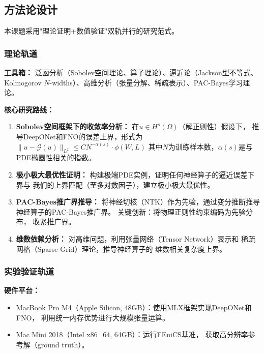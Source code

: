 \documentclass[12pt,a4paper,twoside]{article}
\begin{document}
\subsection{方法论设计}

本课题采用"理论证明+数值验证"双轨并行的研究范式。

\subsubsection{理论轨道}

\textbf{工具箱：}
泛函分析（Sobolev空间理论、算子理论）、逼近论（Jackson型不等式、Kolmogorov $N$-widths）、高维分析（张量分解、稀疏表示）、PAC-Bayes学习理论。

\textbf{核心研究路线：}

\begin{enumerate}
    \item \textbf{Sobolev空间框架下的收敛率分析：}
        在$u\in H^s(\Omega)$（解正则性）假设下，
        推导DeepONet和FNO的误差上界，形式为
        $\|u-\mathcal{G}(u)\|_{L^2} \leq C N^{-\alpha(s)} \cdot \phi(W,L)$
        其中$N$为训练样本数，$\alpha(s)$是与PDE椭圆性相关的指数。

    \item \textbf{极小极大最优性证明：}
        构建极端PDE实例，证明任何神经算子的逼近误差下界与
        我们的上界匹配（至多对数因子），建立极小极大最优性。

    \item \textbf{PAC-Bayes推广界推导：}
        将神经切核（NTK）作为先验，通过变分推断推导
        神经算子的PAC-Bayes推广界。
        关键创新：将物理正则性约束编码为先验分布，
        收紧推广界。

    \item \textbf{维数依赖分析：}
        对高维问题，利用张量网络（Tensor Network）表示和
        稀疏网格（Sparse Grid）理论，推导神经算子的
        维数相关复杂度上界。
\end{enumerate}

\subsubsection{实验验证轨道}

\textbf{硬件平台：}
\begin{itemize}
    \item MacBook Pro M4（Apple Silicon, 48GB）：使用MLX框架实现DeepONet和FNO，
        利用统一内存优势进行大规模张量运算。
    \item Mac Mini 2018（Intel x86\_64, 64GB）：运行FEniCS基准，
        获取高分辨率参考解（ground truth）。
\end{itemize}
\end{document}
